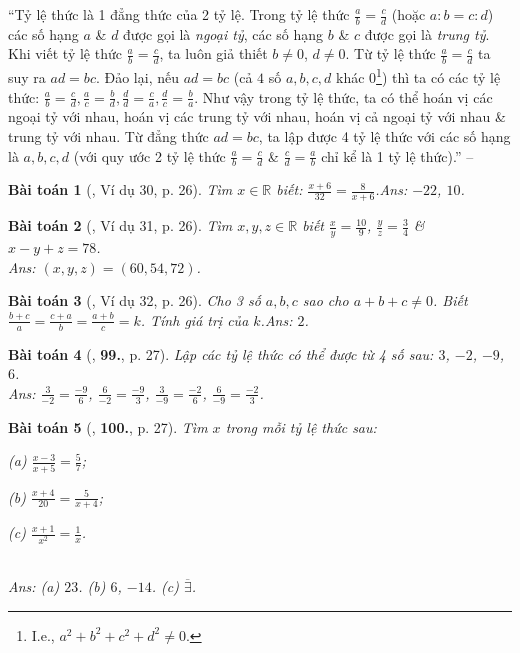 \documentclass{article}
\numberwithin{equation}{section}
\newtheorem{baitoan}{Bài toán}
\begin{document}
``Tỷ lệ thức là 1 đẳng thức của 2 tỷ lệ. Trong tỷ lệ thức $\frac{a}{b} = \frac{c}{d}$ (hoặc $a:b = c:d$) các số hạng $a$ \& $d$ được gọi là \textit{ngoại tỷ}, các số hạng $b$ \& $c$ được gọi là \textit{trung tỷ}. Khi viết tỷ lệ thức $\frac{a}{b} = \frac{c}{d}$, ta luôn giả thiết $b\ne 0$, $d\ne 0$. Từ tỷ lệ thức $\frac{a}{b} = \frac{c}{d}$ ta suy ra $ad = bc$. Đảo lại, nếu $ad = bc$ (cả $4$ số $a,b,c,d$ khác $0$\footnote{I.e., $a^2 + b^2 + c^2 + d^2\ne 0$.}) thì ta có các tỷ lệ thức: $\frac{a}{b} = \frac{c}{d},\frac{a}{c} = \frac{b}{d},\frac{d}{d} = \frac{c}{a},\frac{d}{c} = \frac{b}{a}$. Như vậy trong tỷ lệ thức, ta có thể hoán vị các ngoại tỷ với nhau, hoán vị các trung tỷ với nhau, hoán vị cả ngoại tỷ với nhau \& trung tỷ với nhau. Từ đẳng thức $ad = bc$, ta lập được 4 tỷ lệ thức với các số hạng là $a,b,c,d$ (với quy ước 2 tỷ lệ thức $\frac{a}{b} = \frac{c}{d}$ \& $\frac{c}{d} = \frac{a}{b}$ chỉ kể là 1 tỷ lệ thức).'' -- \cite[\S6, p. 23]{Binh_Toan_7_tap_1}

\begin{baitoan}[\cite{Tuyen_Toan_7}, Ví dụ 30, p. 26]
	Tìm $x\in\mathbb{R}$ biết: $\frac{x + 6}{32} = \frac{8}{x + 6}$.\hfill{\sf Ans:} $-22$, $10$.
\end{baitoan}

\begin{baitoan}[\cite{Tuyen_Toan_7}, Ví dụ 31, p. 26]
	Tìm $x,y,z\in\mathbb{R}$ biết $\frac{x}{y} = \frac{10}{9}$, $\frac{y}{z} = \frac{3}{4}$ \& $x - y + z = 78$.\\\mbox{}\hfill{\sf Ans:} $(x,y,z) = (60,54,72)$.
\end{baitoan}

\begin{baitoan}[\cite{Tuyen_Toan_7}, Ví dụ 32, p. 26]
	Cho 3 số $a,b,c$ sao cho $a + b + c\ne 0$. Biết $\frac{b + c}{a} = \frac{c + a}{b} = \frac{a + b}{c} = k$. Tính giá trị của $k$.\hfill{\sf Ans:} $2$.
\end{baitoan}

\begin{baitoan}[\cite{Tuyen_Toan_7}, \textbf{99.}, p. 27]
	Lập các tỷ lệ thức có thể được từ 4 số sau: $3$, $-2$, $-9$, $6$.\\\mbox{}\hfill{\sf Ans:} $\frac{3}{-2} = \frac{-9}{6}$, $\frac{6}{-2} = \frac{-9}{3}$, $\frac{3}{-9} = \frac{-2}{6}$, $\frac{6}{-9} = \frac{-2}{3}$.
\end{baitoan}

\begin{baitoan}[\cite{Tuyen_Toan_7}, \textbf{100.}, p. 27]
	Tìm $x$ trong mỗi tỷ lệ thức sau:
	\begin{enumerate*}
		\item[(a)] $\frac{x - 3}{x + 5} = \frac{5}{7}$;
		\item[(b)] $\frac{x + 4}{20} = \frac{5}{x + 4}$;
		\item[(c)] $\frac{x + 1}{x^2} = \frac{1}{x}$.
	\end{enumerate*}\\\mbox{}\hfill{\sf Ans:} (a) $23$. (b) $6$, $-14$. (c) $\overline{\exists}$.
\end{baitoan}
\end{document}
